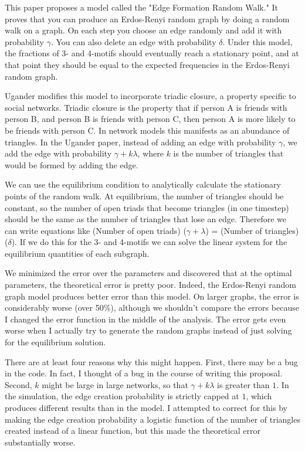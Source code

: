 \documentclass[12pt]{article}
\begin{document}
This paper proposes a model called the "Edge Formation Random Walk."  It proves that you can produce an Erdos-Renyi random graph by doing a random walk on a graph.  On each step you choose an edge randomly and add it with probability $\gamma$.  You can also delete an edge with probability $\delta$.  Under this model, the fractions of 3- and 4-motifs should eventually reach a stationary point, and at that point they should be equal to the expected frequencies in the Erdos-Renyi random graph.

Ugander modifies this model to incorporate triadic closure, a property specific to social networks.  Triadic closure is the property that if person A is friends with person B, and person B is friends with person C, then person A is more likely to be friends with person C.  In network models this manifests as an abundance of triangles.  In the Ugander paper, instead of adding an edge with probability $\gamma$, we add the edge with probability $\gamma + k\lambda$, where $k$ is the number of triangles that would be formed by adding the edge.

We can use the equilibrium condition to analytically calculate the stationary points of the random walk.  At equilibrium, the number of triangles should be constant, so the number of open triads that become triangles (in one timestep) should be the same as the number of triangles that lose an edge.  Therefore we can write equations like (Number of open triads) ($\gamma + \lambda$) = (Number of triangles) ($\delta$).  If we do this for the 3- and 4-motifs we can solve the linear system for the equilibrium quantities of each subgraph.

We minimized the error over the parameters and discovered that at the optimal parameters, the theoretical error is pretty poor.  Indeed, the Erdos-Renyi random graph model produces better error than this model.  On larger graphs, the error is considerably worse (over 50\%), although we shouldn't compare the errors because I changed the error function in the middle of the analysis.  The error gets even worse when I actually try to generate the random graphs instead of just solving for the equilibrium solution.

There are at least four reasons why this might happen.  First, there may be a bug in the code.  In fact, I thought of a bug in the course of writing this proposal.  Second, $k$ might be large in large networks, so that $\gamma + k\lambda$ is greater than $1$.  In the simulation, the edge creation probability is strictly capped at $1$, which produces different results than in the model.  I attempted to correct for this by making the edge creation probability a logistic function of the number of triangles created instead of a linear function, but this made the theoretical error substantially worse.
\end{document}
